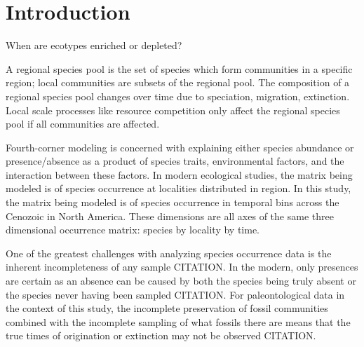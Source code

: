 \documentclass[12pt,letterpaper]{article}
\begin{document}
\section*{Introduction}


When are ecotypes enriched or depleted?

A regional species pool is the set of species which form communities in a specific region; local communities are subsets of the regional pool. The composition of a regional species pool changes over time due to speciation, migration, extinction. Local scale processes like resource competition only affect the regional species pool if all communities are affected.

Fourth-corner modeling is concerned with explaining either species abundance or presence/absence as a product of species traits, environmental factors, and the interaction between these factors. In modern ecological studies, the matrix being modeled is of species occurrence at localities distributed in region. In this study, the matrix being modeled is of species occurrence in temporal bins across the Cenozoic in North America. These dimensions are all axes of the same three dimensional occurrence matrix: species by locality by time.

 One of the greatest challenges with analyzing species occurrence data is the inherent incompleteness of any sample CITATION. In the modern, only presences are certain as an absence can be caused by both the species being truly absent or the species never having been sampled CITATION. For paleontological data in the context of this study, the incomplete preservation of fossil communities combined with the incomplete sampling of what fossils there are means that the true times of origination or extinction may not be observed CITATION.


\end{document}
